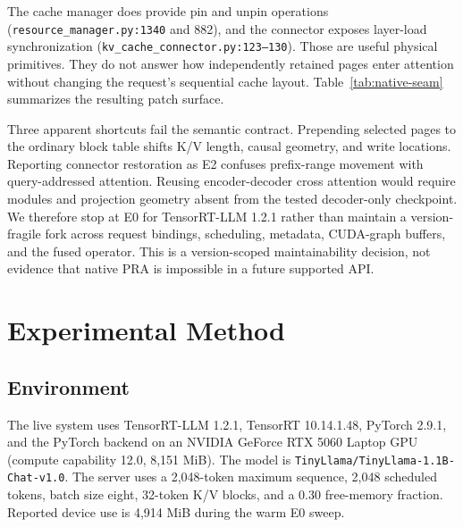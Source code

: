 \documentclass[10pt]{article}
\begin{document}
The cache manager does provide pin and unpin operations
(\texttt{resource\_manager.py:1340} and 882), and the connector exposes
layer-load synchronization (\texttt{kv\_cache\_connector.py:123--130}). Those
are useful physical primitives. They do not answer how independently retained
pages enter attention without changing the request's sequential cache layout.
Table~\ref{tab:native-seam} summarizes the resulting patch surface.

\begin{table}[ht]
\centering
\scriptsize
\caption{Installed-source feasibility audit. All five surfaces must agree for
native E2; connector availability alone is insufficient.}
\label{tab:native-seam}

\end{table}

Three apparent shortcuts fail the semantic contract. Prepending selected pages
to the ordinary block table shifts K/V length, causal geometry, and write
locations. Reporting connector restoration as E2 confuses prefix-range
movement with query-addressed attention. Reusing encoder-decoder cross
attention would require modules and projection geometry absent from the tested
decoder-only checkpoint. We therefore stop at E0 for TensorRT-LLM 1.2.1 rather
than maintain a version-fragile fork across request bindings, scheduling,
metadata, CUDA-graph buffers, and the fused operator. This is a version-scoped
maintainability decision, not evidence that native PRA is impossible in a
future supported API.

\section{Experimental Method}
\subsection{Environment}
The live system uses TensorRT-LLM 1.2.1, TensorRT 10.14.1.48, PyTorch 2.9.1,
and the PyTorch backend on an NVIDIA GeForce RTX 5060 Laptop GPU (compute
capability 12.0, 8,151 MiB). The model is
\texttt{TinyLlama/TinyLlama-1.1B-Chat-v1.0}. The server uses a 2,048-token
maximum sequence, 2,048 scheduled tokens, batch size eight, 32-token K/V
blocks, and a 0.30 free-memory fraction. Reported device use is 4,914 MiB
during the warm E0 sweep.
\end{document}
